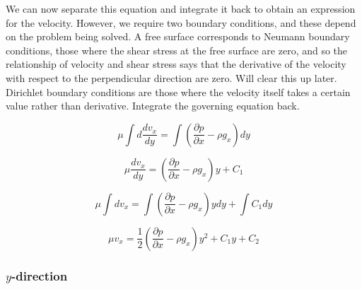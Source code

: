 We can now separate this equation and integrate it back to obtain an expression for the velocity.
However, we require two boundary conditions, and these depend on the problem being solved.
A free surface corresponds to Neumann boundary conditions, those where the shear stress at the free surface are zero, and so the relationship of velocity and shear stress says that the derivative of the velocity with respect to the perpendicular direction are zero.
Will clear this up later.
Dirichlet boundary conditions are those where the velocity itself takes a certain value rather than derivative.
Integrate the governing equation back.

\begin{equation*}
  \mu\int d\frac{dv_{x}}{dy}=\int\left(\frac{\partial{}p}{\partial{}x}-\rho{}g_{x}\right)dy
\end{equation*}

\begin{equation*}
  \mu\frac{dv_{x}}{dy}=\left(\frac{\partial{}p}{\partial{}x}-\rho{}g_{x}\right)y+C_{1}
\end{equation*}

\begin{equation*}
  \mu\int dv_{x}=\int\left(\frac{\partial{}p}{\partial{}x}-\rho{}g_{x}\right)ydy+\int C_{1}dy
\end{equation*}

\begin{equation*}
  \mu{}v_{x}=\frac{1}{2}\left(\frac{\partial{}p}{\partial{}x}-\rho{}g_{x}\right)y^{2}+C_{1}y+C_{2}
\end{equation*}

\subsubsection{$y$-direction}

